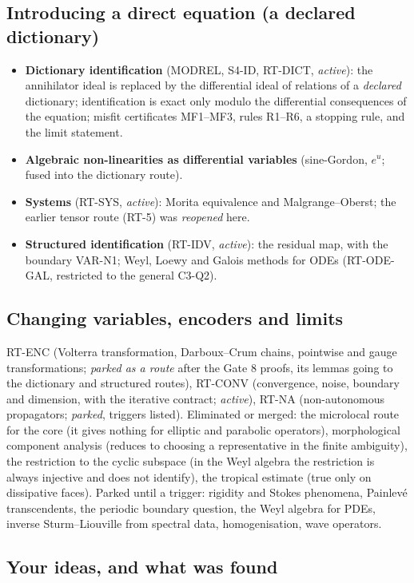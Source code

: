 \subsection{Introducing a direct equation (a declared dictionary)}
\begin{itemize}
\item \textbf{Dictionary identification} (MODREL, S4-ID, RT-DICT, \emph{active}): the annihilator ideal is replaced by the differential ideal of relations of a \emph{declared} dictionary; identification is exact only modulo the differential consequences of the equation; misfit certificates MF1--MF3, rules R1--R6, a stopping rule, and the limit statement.
\item \textbf{Algebraic non-linearities as differential variables} (sine-Gordon, $e^u$; fused into the dictionary route).
\item \textbf{Systems} (RT-SYS, \emph{active}): Morita equivalence and Malgrange--Oberst; the earlier tensor route (RT-5) was \emph{reopened} here.
\item \textbf{Structured identification} (RT-IDV, \emph{active}): the residual map, with the boundary VAR-N1; Weyl, Loewy and Galois methods for ODEs (RT-ODE-GAL, restricted to the general C3-Q2).
\end{itemize}

\subsection{Changing variables, encoders and limits}
RT-ENC (Volterra transformation, Darboux--Crum chains, pointwise and gauge transformations; \emph{parked as a route} after the Gate 8 proofs, its lemmas going to the dictionary and structured routes), RT-CONV (convergence, noise, boundary and dimension, with the iterative contract; \emph{active}), RT-NA (non-autonomous propagators; \emph{parked}, triggers listed).
Eliminated or merged: the microlocal route for the core (it gives nothing for elliptic and parabolic operators), morphological component analysis (reduces to choosing a representative in the finite ambiguity), the restriction to the cyclic subspace (in the Weyl algebra the restriction is always injective and does not identify), the tropical estimate (true only on dissipative faces).
Parked until a trigger: rigidity and Stokes phenomena, Painlev\'e transcendents, the periodic boundary question, the Weyl algebra for PDEs, inverse Sturm--Liouville from spectral data, homogenisation, wave operators.

\subsection{Your ideas, and what was found}
